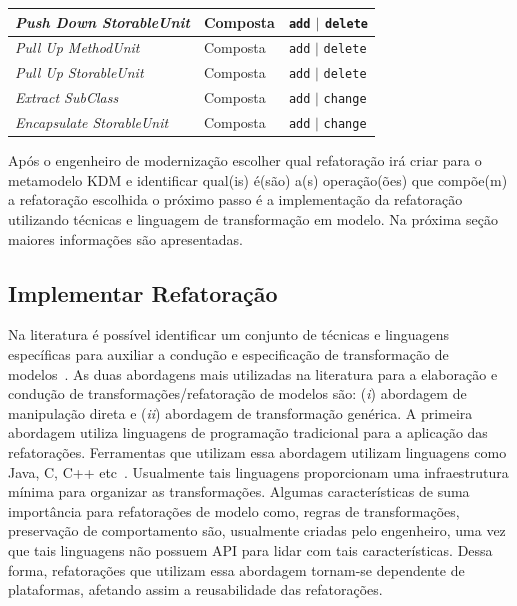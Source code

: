 \begin{table}[h]
\begin{center}
\begin{tabular}{ | m{4.5cm} | m{2.5cm} | m{4cm}| }
\hline
\textit{Push Down StorableUnit} &  Composta & \texttt{add} $|$ \texttt{delete}\\ 
\hline
\textit{Pull Up MethodUnit} &  Composta & \texttt{add} $|$ \texttt{delete}\\
\hline
\textit{Pull Up StorableUnit} &  Composta & \texttt{add} $|$ \texttt{delete}\\
\hline
\textit{Extract SubClass} &  Composta & \texttt{add} $|$ \texttt{change}\\
\hline
\textit{Encapsulate StorableUnit} &  Composta & \texttt{add} $|$ \texttt{change}\\
\hline
\end{tabular}
\end{center}
\end{table}

Após o engenheiro de modernização escolher qual refatoração irá criar para o metamodelo KDM e identificar qual(is) é(são) a(s) operação(ões) que compõe(m) a refatoração escolhida o próximo passo é a implementação da refatoração utilizando técnicas e linguagem de transformação em modelo. Na próxima seção maiores informações são apresentadas.

\subsection{Implementar Refatoração}\label{sec:linguagemDeTransformacaoUtilizada}

Na literatura é possível identificar um conjunto de técnicas e linguagens específicas para auxiliar a condução e especificação de transformação de modelos~\cite{Biehl_2010, Mens_2006, Allilaire_06}. As duas abordagens mais utilizadas na literatura para a elaboração e condução de transformações/refatoração de modelos são: (\textit{i}) abordagem de manipulação direta e (\textit{ii}) abordagem de transformação genérica. A primeira abordagem utiliza linguagens de programação tradicional para a aplicação das refatorações. Ferramentas que utilizam essa abordagem utilizam linguagens como Java, C, C++ etc~\cite{Bruneliere_2014}. Usualmente tais linguagens proporcionam uma infraestrutura mínima para organizar as transformações. Algumas características de suma importância para refatorações de modelo como, regras de transformações, preservação de comportamento são, usualmente criadas pelo engenheiro, uma vez que tais linguagens não possuem API para lidar com tais características. Dessa forma, refatorações que utilizam essa abordagem tornam-se dependente de plataformas, afetando assim a reusabilidade das refatorações. 

